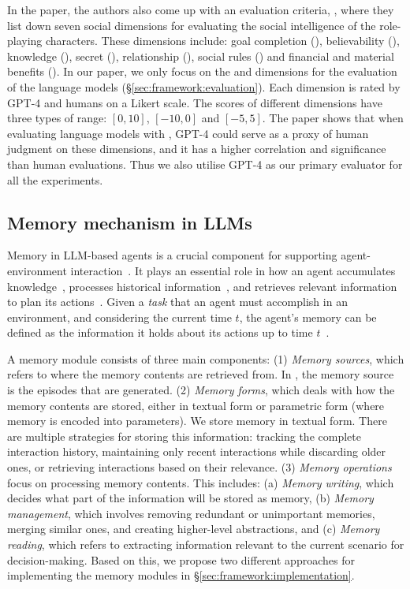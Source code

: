 In the paper, the authors also come up with an evaluation criteria, \sotopiaeval, where they list down seven social dimensions for evaluating the social intelligence of the role-playing characters. These dimensions include: goal completion (\goalcompletion), believability (\believability), knowledge (\knowledge), secret (\secret), relationship (\relationship), social rules (\socialrules) and financial and material benefits (\financialbenefits). In our paper, we only focus on the \goalcompletion and \believability dimensions for the evaluation of the language models (\S \ref{sec:framework:evaluation}). Each dimension is rated by GPT-4 \citep{openai2024gpt4} and humans on a Likert scale. The scores of different dimensions have three types of range: $[0,10]$, $[-10,0]$ and $[-5,5]$. The paper shows that when evaluating language models with \sotopiaeval, GPT-4 could serve as a proxy of human judgment on these dimensions, and it has a higher correlation and significance than human evaluations. Thus we also utilise GPT-4 as our primary evaluator for all the experiments.


\subsection{Memory mechanism in LLMs}
\label{sec:background:memory}
Memory in LLM-based agents is a crucial component for supporting agent-environment interaction~\citep{zhang2024surveymemorymechanismlarge}. It plays an essential role in how an agent accumulates knowledge~\citep{zheng2024synapsetrajectoryasexemplarpromptingmemory}, processes historical information~\citep{10.1145/3397271.3401099, zhu2023ghostminecraftgenerallycapable}, and retrieves relevant information to plan its actions~\citep{zhao2023expelllmagentsexperiential}. Given a \textit{task} that an agent must accomplish in an environment, and considering the current time $t$, the agent's memory can be defined as the information it holds about its actions up to time $t$~\citep{zhang2024surveymemorymechanismlarge}.  

A memory module consists of three main components: (1) \textit{Memory sources}, which refers to where the memory contents are retrieved from. In \lifelongsotopia, the memory source is the episodes that are generated. (2) \textit{Memory forms}, which deals with how the memory contents are stored, either in textual form or parametric form (where memory is encoded into parameters). We store memory in textual form. There are multiple strategies for storing this information: tracking the complete interaction history, maintaining only recent interactions while discarding older ones, or retrieving interactions based on their relevance. (3) \textit{Memory operations} focus on processing memory contents. This includes: (a) \textit{Memory writing}, which decides what part of the information will be stored as memory, (b) \textit{Memory management}, which involves removing redundant or unimportant memories, merging similar ones, and creating higher-level abstractions, and (c) \textit{Memory reading}, which refers to extracting information relevant to the current scenario for decision-making. Based on this, we propose two different approaches for implementing the memory modules in \S \ref{sec:framework:implementation}. 